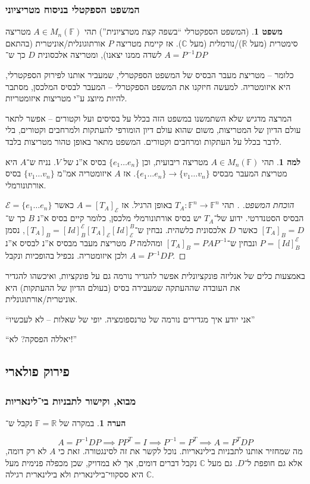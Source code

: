 \documentclass[a4paper]{article}
\newcommand\R     {\mathbb{R}}
\newcommand\C     {\mathbb{C}}
\newcommand\ec    {\mathcal{E}}
\newcommand\F         {\mathbb{F}}
\newcommand\co        {\colon}
\newcommand\op    {^{-1}}
\theoremstyle{definition}
\newtheorem{Theorem}{משפט}
\newtheorem{Lemma}{למה}
\newtheorem{Remark}{הערה}
\newcommand\theo  [1] {\begin{Theorem}#1\end{Theorem}}
\newcommand\rmark [1] {\begin{Remark}#1\end{Remark}}
\newcommand\lem   [1] {\begin{Lemma}#1\end{Lemma}}
\begin{document}
	\subsubsection{המשפט הספקטלי בניסוח מטריציוני}
	\theo{(המשפט הספקטרלי ``בשפה קצת מטרציונית'') תהי $A \in M_n(\F)$ מטריצה סימטרית (מעל $\R$)/נורמלית (מעל $\C$). אז קיימת  מטריצה $P$ אורתוגונלית/אוניטרית (בהתאם לשדה ממנו יצאנו), ומטריצה אלכסונית $D$ כך ש־
		$ A = P\op D P $}
	כלומר – מטריצת מעבר הבסיס של המשפט הספקטרלי, שמעביר אותנו לפירוק הספקטרלי, היא איזומטריה. למעשה חיזקנו את המשפט הספקטרלי – המעבר לבסיס המלכסן, מסתבר להיות מיוצג ע''י מטריצות איזומטריות. 
	
	המרצה מדגיש שלא השתמשנו במשפט הזה בכלל על בסיסים ועל וקטורים – אפשר לתאר עולם הדיון של המטריצות, משום שהוא עולם דיון הומורפי להעתקות ולמרחבים וקטורים, בלי לדבר בכלל על העתקות ומרחבים וקטורים. המשפט מתאר באופן טהור מטריצות בלבד. 
	
	\lem{תהי $A \in M_n(\F)$ מטריצה ריבועית, וכן $\{e_1 \dots e_n\}$ בסיס א''נ של $V$. נניח ש־$A$ היא מטריצת המעבר מבסיס $\{e_1 \dots e_n\} \to \{v_1 \dots v_n\}$. אז $A$ איזומטריה אמ''מ $\{v_1 \dots v_n\}$ בסיס אורתונורמלי. }
	\begin{proof}[הוכחת המשפט. ]
		תהי $T_A \co \F^n \to \F^n$ באופן הרגיל. אז $A= [T_A]_\ec$ כאשר $\ec = \{e_1 \dots e_n\}$ הבסיס הסטנדרטי. ידוע של־$T_A$ יש בסיס אורתונורמלי מלכסן, כלומר קיים בסיס א''נ $B$ כך ש־$[T_A]_B = D$ כאשר $D$ אלכסונית כלשהית. נבחין ש־$[T_A]_B = [Id]^\ec_B [T_A]_\ec [Id]_\ec^B$, נסמן $P = [Id]^\ec_B$ ונבחין ש־$[T_A]_B = PAP\op$ ומהלמה $P$ מטריצת מעבר מבסיס א''נ לבסיס א''נ ולכן איזומטריה. נכפיל בהופכיות ונקבל $A = P\op DP$. 
	\end{proof}
	
	
	באמצעות כלים של אנליזה פונקציונלית אפשר להגדיר נורמה גם על פונקציות, ואיכשהו להגדיר את העובדה שההעתקה שמעבירה בסיס (בעולם הדיון של ההעתקות) היא אוניטרית/אורתוגונלית. 
	
	``אני יודע איך מגדירים נורמה של טרנספומציה. יופי של שאלות – לא לעכשיו''
	
	``יאללה הפסקה? לא!''
	
	\subsection{פירוק פולארי}
	\subsubsection{מבוא, וקישור לתבניות בי־לינאריות}
	\rmark{במקרה של $\F= \R$ נקבל ש־}
	\[ A = P\op DP \implies PP^T = I \implies P\op = P^T \implies A = P^TDP \]
	מה שמחזיר אותנו לתבניות בילינאריות. נוכל לקשר את זה לסינגטורה. זאת כי $A$ לא רק דומה, אלא גם חופפת ל־$D$. גם מעל $\C$ נקבל דברים דומים, אך לא במדויק, שכן מכפלה פנימית מעל $\C$ היא ססקווי־בילינארית ולא בילינארית רגילה. 
	
\end{document}
